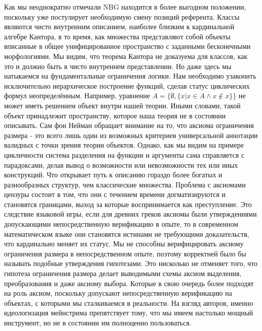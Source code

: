 \documentclass[12pt]{article}
\begin{document}
Как мы неоднократно отмечали NBG находится в более выгодном положении, поскольку уже постулирует необходимую смену позиций референта. Классы являются чисто внутренним описанием, наиболее близким к кардинальной алгебре Кантора, в то время, как множества представляют собой объекты вписанные в общее унифицированное пространство с заданными бесконечными морфологиями. Мы видим, что теорема Кантора не доказуема для классов, как это и должно быть в чисто внутреннем представлении. Но даже здесь мы натыкаемся на фундаментальные ограничения логики. Нам необходимо узаконить исключительно иерархическое построение функций, сделав статус циклических формул неопределённым. Например, уравнение $A = \{ \emptyset, \{ x | x \in A \wedge x \notin x \} \}$ не может иметь решением объект внутри нашей теории. Иными словами, такой объект принадлежит пространству, которое наша теория не в состоянии описывать. Сам фон Нейман обращает внимание на то, что аксиома ограничения размера - это всего лишь один из возможных критериев универсальной аннотации валидных с точки зрения теории объектов. Однако, как мы видим на примере цикличности система разделения на функции и аргументы сама справляется с парадоксами, делая вывод о возможности или невозможности тех или иных конструкций. Что открывает путь к описанию гораздо более богатых и разнообразных структур, чем классические множества. Проблема с аксиомами цензуры состоит в том, что они с течением времени догматизируются и становятся границами, выход за которые воспринимается как преступление. Это следствие языковой игры, если для древних греков аксиомы были утверждениями допускающими непосредственную верификацию в опыте, то в современном математическом языке они становятся истинами не требующими доказательств, что кардинально меняет их статус. Мы не способны верифицировать аксиому ограничения размера в непосредственном опыте, поэтому корректней было бы называть подобные утверждения гипотезами. Это нисколько не отменяет того, что гипотеза ограничения размера делает выводимыми схемы аксиом выделения, преобразования и даже аксиому выбора. Которые в свою очередь более подходят на роль аксиом, поскольку допускают непосредственную верификацию на объектах, с которыми мы сталкиваемся в реальности. На взгляд авторов, именно идеологизация мейнстрима препятствует тому, что мы имеем настолько мощный инструмент, но не в состоянии им полноценно пользоваться.
\end{document}
